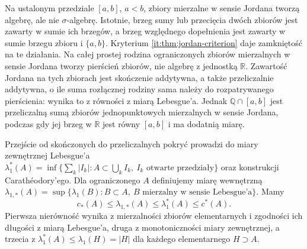 Na ustalonym przedziale $[a,b]$, $a<b$, zbiory mierzalne w sensie Jordana tworzą algebrę, ale nie $\sigma$-algebrę. Istotnie, brzeg sumy lub przecięcia dwóch zbiorów jest zawarty w sumie ich brzegów, a brzeg względnego dopełnienia jest zawarty w sumie brzegu zbioru i $\{a,b\}$. Kryterium \ref{it:thm:jordan-criterion} daje zamkniętość na te działania. Na całej prostej rodzina ograniczonych zbiorów mierzalnych w sensie Jordana tworzy pierścień zbiorów, nie algebrę z jednostką $\mathbb{R}$. Zawartość Jordana na tych zbiorach jest skończenie addytywna, a także przeliczalnie addytywna, o ile suma rozłącznej rodziny sama należy do rozpatrywanego pierścienia: wynika to z równości z miarą Lebesgue'a. Jednak $\mathbb{Q}\cap[a,b]$ jest przeliczalną sumą zbiorów jednopunktowych mierzalnych w sensie Jordana, podczas gdy jej brzeg w $\mathbb{R}$ jest równy $[a,b]$ i ma dodatnią miarę.

Przejście od skończonych do przeliczalnych pokryć prowadzi do miary zewnętrznej Lebesgue'a $\lambda_1^*(A)=\inf\{\sum_k|I_k|:A\subset\bigcup_k I_k,\ I_k\text{ otwarte przedziały}\}$ oraz konstrukcji Carathéodory'ego. Dla ograniczonego $A$ definiujemy miarę wewnętrzną $\lambda_{1,*}(A)=\sup\{\lambda_1(B):B\subset A,\ B\text{ mierzalny w sensie Lebesgue'a}\}$. Mamy
\[
 c_*(A)\le\lambda_{1,*}(A)\le\lambda_1^*(A)\le c^*(A).
\]
Pierwsza nierówność wynika z mierzalności zbiorów elementarnych i zgodności ich długości z miarą Lebesgue'a, druga z monotoniczności miary zewnętrznej, a trzecia z $\lambda_1^*(A)\le\lambda_1(H)=|H|$ dla każdego elementarnego $H\supset A$.

